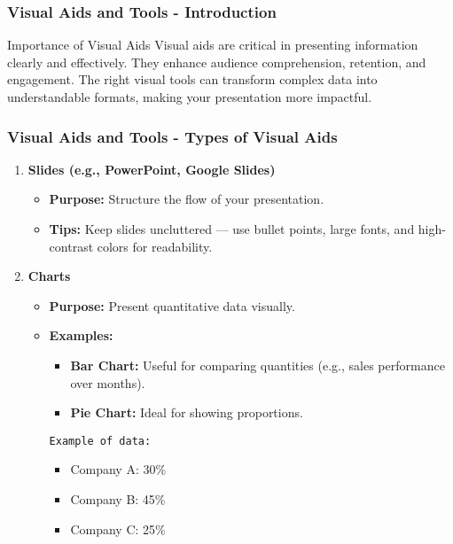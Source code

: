 \documentclass[aspectratio=169]{beamer}
\begin{document}
\begin{frame}[fragile]
    \frametitle{Visual Aids and Tools - Introduction}
    \begin{block}{Importance of Visual Aids}
        Visual aids are critical in presenting information clearly and effectively. They enhance audience comprehension, retention, and engagement. The right visual tools can transform complex data into understandable formats, making your presentation more impactful.
    \end{block}
\end{frame}

\begin{frame}[fragile]
    \frametitle{Visual Aids and Tools - Types of Visual Aids}
    \begin{enumerate}
        \item \textbf{Slides (e.g., PowerPoint, Google Slides)}
        \begin{itemize}
            \item \textbf{Purpose:} Structure the flow of your presentation.
            \item \textbf{Tips:} Keep slides uncluttered — use bullet points, large fonts, and high-contrast colors for readability.
        \end{itemize}

        \item \textbf{Charts}
        \begin{itemize}
            \item \textbf{Purpose:} Present quantitative data visually.
            \item \textbf{Examples:}
            \begin{itemize}
                \item \textbf{Bar Chart:} Useful for comparing quantities (e.g., sales performance over months).
                \item \textbf{Pie Chart:} Ideal for showing proportions.
            \end{itemize}
            \lstinline!Example of data:!
            \begin{itemize}
                \item Company A: 30\%
                \item Company B: 45\%
                \item Company C: 25\%
            \end{itemize}
        \end{itemize}
    \end{enumerate}
\end{frame}
\end{document}
